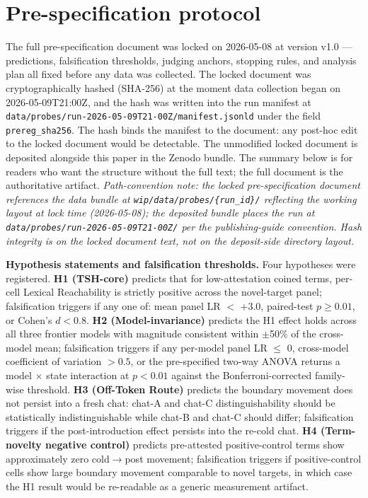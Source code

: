 \documentclass[11pt,a4paper]{article}
\begin{document}
\section{Pre-specification protocol}

The full pre-specification document was locked on 2026-05-08 at version v1.0 --- predictions, falsification thresholds, judging anchors, stopping rules, and analysis plan all fixed before any data was collected. The locked document was cryptographically hashed (SHA-256) at the moment data collection began on 2026-05-09T21:00Z, and the hash was written into the run manifest at \texttt{data/probes/run-2026-05-09T21-00Z/manifest.jsonld} under the field \texttt{prereg\_sha256}. The hash binds the manifest to the document: any post-hoc edit to the locked document would be detectable. The unmodified locked document is deposited alongside this paper in the Zenodo bundle. The summary below is for readers who want the structure without the full text; the full document is the authoritative artifact. \textit{Path-convention note: the locked pre-specification document references the data bundle at \texttt{wip/data/probes/\{run\_id\}/} reflecting the working layout at lock time (2026-05-08); the deposited bundle places the run at \texttt{data/probes/run-2026-05-09T21-00Z/} per the publishing-guide convention. Hash integrity is on the locked document text, not on the deposit-side directory layout.}

\textbf{Hypothesis statements and falsification thresholds.} Four hypotheses were registered. \textbf{H1 (TSH-core)} predicts that for low-attestation coined terms, per-cell Lexical Reachability is strictly positive across the novel-target panel; falsification triggers if any one of: mean panel LR $<$ +3.0, paired-test $p \geq 0.01$, or Cohen's $d < 0.8$. \textbf{H2 (Model-invariance)} predicts the H1 effect holds across all three frontier models with magnitude consistent within $\pm$50\% of the cross-model mean; falsification triggers if any per-model panel LR $\leq$ 0, cross-model coefficient of variation $> 0.5$, or the pre-specified two-way ANOVA returns a model $\times$ state interaction at $p < 0.01$ against the Bonferroni-corrected family-wise threshold. \textbf{H3 (Off-Token Route)} predicts the boundary movement does not persist into a fresh chat: chat-A and chat-C distinguishability should be statistically indistinguishable while chat-B and chat-C should differ; falsification triggers if the post-introduction effect persists into the re-cold chat. \textbf{H4 (Term-novelty negative control)} predicts pre-attested positive-control terms show approximately zero cold$\to$post movement; falsification triggers if positive-control cells show large boundary movement comparable to novel targets, in which case the H1 result would be re-readable as a generic measurement artifact.
\end{document}
